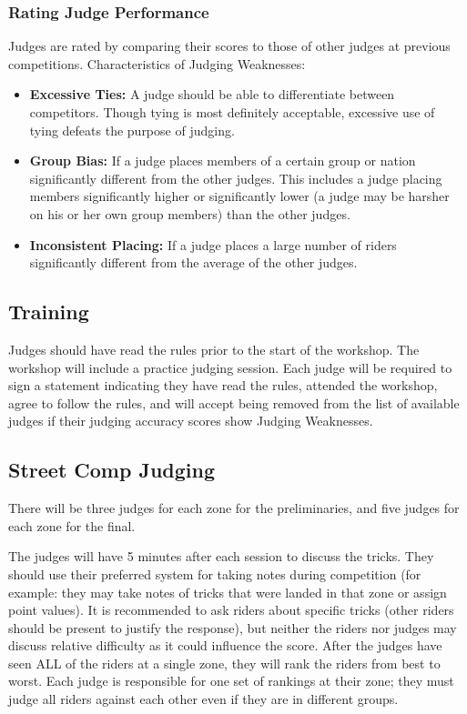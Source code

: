 \subsubsection{Rating Judge Performance}
Judges are rated by comparing their scores to those of other judges at previous competitions.
Characteristics of Judging Weaknesses:
\begin{itemize}
\item \textbf{Excessive Ties:}
A judge should be able to differentiate between competitors.
Though tying is most definitely acceptable, excessive use of tying defeats the purpose of judging.
\item \textbf{Group Bias:}
If a judge places members of a certain group or nation significantly different from the other judges.
This includes a judge placing members significantly higher or significantly lower (a judge may be harsher on his or her own group members) than the other judges.
\item\textbf{Inconsistent Placing:}
If a judge places a large number of riders significantly different from the average of the other judges.
\end{itemize}

\subsection{Training}
Judges should have read the rules prior to the start of the workshop.
The workshop will include a practice judging session.
Each judge will be required to sign a statement indicating they have read the rules, attended the workshop, agree to follow the rules, and will accept being removed from the list of available judges if their judging accuracy scores show Judging Weaknesses.

\subsection{Street Comp Judging}
There will be three judges for each zone for the preliminaries, and five judges for each zone for the final.

The judges will have 5 minutes after each session to discuss the tricks.
They should use their preferred system for taking notes during competition (for example: they may take notes of tricks that were landed in that zone or assign point values).
It is recommended to ask riders about specific tricks (other riders should be present to justify the response), but neither the riders nor judges may discuss relative difficulty as it could influence the score.
After the judges have seen ALL of the riders at a single zone, they will rank the riders from best to worst.
Each judge is responsible for one set of rankings at their zone; they must judge all riders against each other even if they are in different groups.

